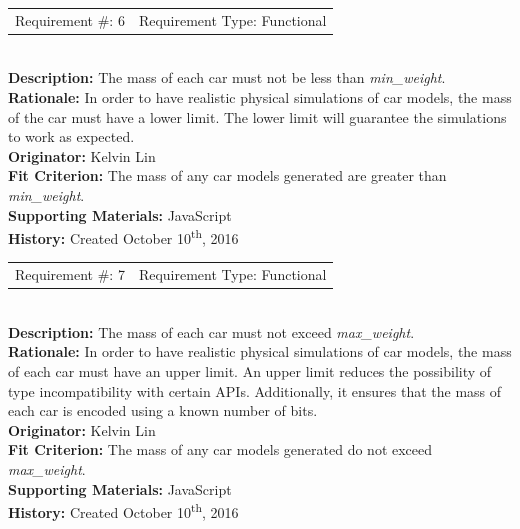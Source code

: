 \documentclass[12pt, titlepage]{article}
\begin{document}
\begin{reqbox}
%
\begin{tabular}{cc}
Requirement \#: 6 & Requirement Type: Functional \\
\end{tabular} \\
%
\textbf{Description:} The mass of each car must not be less than 
\textit{min\_weight}. \\
\textbf{Rationale:} In order to have realistic physical simulations of car 
models, the mass of the car must have a lower limit. The lower limit will 
guarantee the simulations to work as expected. \\
\textbf{Originator:} Kelvin Lin\\
\textbf{Fit Criterion:} The mass of any car models generated are greater than 
\textit{min\_weight}.\\
%  
\textbf{Supporting Materials:} JavaScript \\
\textbf{History:} Created October 10\textsuperscript{th}, 2016
%
\end{reqbox}

\begin{reqbox}
%
\begin{tabular}{cc}
Requirement \#: 7 & Requirement Type: Functional \\
\end{tabular} \\
%
\textbf{Description:} The mass of each car must not exceed \textit{max\_weight}. 
\\
\textbf{Rationale:} In order to have realistic physical simulations of car 
models, the mass of each car must have an upper limit. An upper limit reduces 
the possibility of type incompatibility with certain APIs. Additionally, it 
ensures that the mass of each car is encoded using a known number of bits.\\
\textbf{Originator:} Kelvin Lin\\
\textbf{Fit Criterion:} The mass of any car models generated do not exceed 
\textit{max\_weight}.\\
%  
\textbf{Supporting Materials:} JavaScript \\
\textbf{History:} Created October 10\textsuperscript{th}, 2016
%
\end{reqbox}
\end{document}
